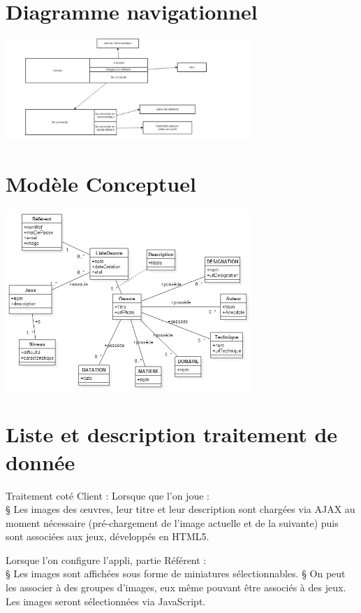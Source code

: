\documentclass[12pt,a4paper]{report}
\begin{document}
\chapter{ Diagramme navigationnel}
\includegraphics[width=350px]{../../UML/diagramme_navigationnel.jpg}\\

\chapter{Modèle Conceptuel}
\includegraphics[width=350px]{../../UML/diagrammeClasse.png}\\


\chapter{Liste et description traitement de donnée}
Traitement coté Client : 
Lorsque que l’on joue :\\
§  Les images des œuvres, leur titre et leur description sont chargées via AJAX au moment nécessaire (pré-chargement de l’image actuelle et de la suivante) puis sont associées aux jeux, développés en HTML5.
 
Lorsque l’on configure l’appli, partie Référent :\\
§  Les images sont affichées sous forme de miniatures sélectionnables.
§  On peut les associer à des groupes d’images, eux même pouvant être associés à des jeux. Les images seront sélectionnées via JavaScript.
 
\end{document}
